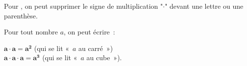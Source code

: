 

\begin{aconnaitre}
Pour , on peut supprimer le signe de multiplication "$\cdot$" devant une lettre ou une parenthèse.
\end{aconnaitre}

\begin{aconnaitre}
\begin{minipage}[t]{0.38\linewidth}
Pour tout nombre $a$, on peut écrire : 
 \end{minipage} \hfill%
\begin{minipage}[t]{0.58\linewidth}
\textcolor{H1}{$\pmb{a \cdot a = a^2}$} \hspace{1em} (qui se lit  « $a$ au carré ») \\[0.5em]
\textcolor{H1}{$\pmb{a \cdot a \cdot a = a^3}$} \hspace{1em} (qui se lit « $a$ au cube »).
 \end{minipage} \\
\end{aconnaitre}

